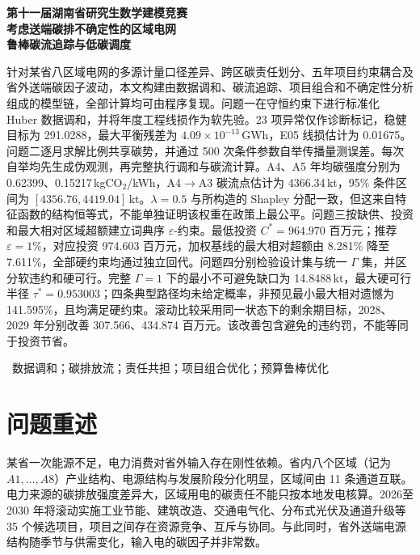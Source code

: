 \documentclass[UTF8,a4paper,zihao=-4,fontset=fandol]{ctexart}
\begin{document}
\begin{center}
{\heiti{}\bfseries 第十一届湖南省研究生数学建模竞赛}\\[1.4em]
{\heiti{}\bfseries 考虑送端碳排不确定性的区域电网}\\[0.35em]
{\heiti{}\bfseries 鲁棒碳流追踪与低碳调度}
\end{center}
\vspace{1.1em}

\quad
针对某省八区域电网的多源计量口径差异、跨区碳责任划分、五年项目约束耦合及省外送端碳因子波动，本文构建由数据调和、碳流追踪、项目组合和不确定性分析组成的模型链，全部计算均可由程序复现。问题一在守恒约束下进行标准化 Huber 数据调和，并将年度工程线损作为软先验。23 项异常仅作诊断标记，稳健目标为 291.0288，最大平衡残差为 $4.09\times10^{-13}$\,GWh，E05 线损估计为 0.01675。问题二逐月求解比例共享碳势，并通过 500 次条件参数自举传播量测误差。每次自举均先生成伪观测，再完整执行调和与碳流计算。A4、A5 年均碳强度分别为 0.62399、0.15217\,kgCO$_2$/kWh，A4$\to$A3 碳流点估计为 4366.34\,kt，95\% 条件区间为 $[4356.76,4419.04]$\,kt。$\lambda=0.5$ 与所构造的 Shapley 分配一致，但这来自特征函数的结构恒等式，不能单独证明该权重在政策上最公平。问题三按缺供、投资和最大相对区域超额建立词典序 $\varepsilon$-约束。最低投资 $C^*=964.970$ 百万元；推荐 $\varepsilon=1\%$，对应投资 974.603 百万元，加权基线的最大相对超额由 8.281\% 降至 7.611\%，全部硬约束均通过独立回代。问题四分别检验设计集与统一 $\Gamma$ 集，并区分软违约和硬可行。完整 $\Gamma=1$ 下的最小不可避免缺口为 14.8488\,kt，最大硬可行半径 $\tau^*=0.953003$；四条典型路径均未给定概率，非预见最小最大相对遗憾为 141.595\%，且均满足硬约束。滚动比较采用同一状态下的剩余期目标，2028、2029 年分别改善 307.566、434.874 百万元。该改善包含避免的违约罚，不能等同于投资节省。

\vspace{0.6em}
\ 数据调和；碳排放流；责任共担；项目组合优化；预算鲁棒优化

\newpage

\section{问题重述}

某省一次能源不足，电力消费对省外输入存在刚性依赖。省内八个区域（记为 $A1,\ldots,A8$）产业结构、电源结构与发展阶段分化明显，区域间由 11 条通道互联。电力来源的碳排放强度差异大，区域用电的碳责任不能只按本地发电核算。2026至2030 年将滚动实施工业节能、建筑改造、交通电气化、分布式光伏及通道升级等 35 个候选项目，项目之间存在资源竞争、互斥与协同。与此同时，省外送端电源结构随季节与供需变化，输入电的碳因子并非常数。
\end{document}
